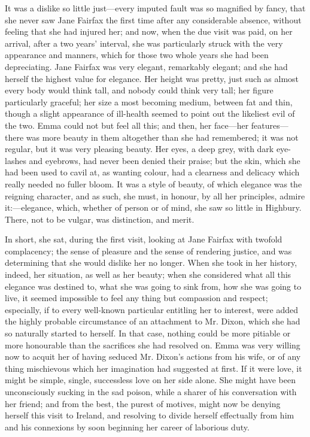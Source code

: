 It was a dislike so little just---every imputed fault was so magnified by fancy, that she never saw Jane Fairfax the first time after any considerable absence, without feeling that she had injured her; and now, when the due visit was paid, on her arrival, after a two years' interval, she was particularly struck with the very appearance and manners, which for those two whole years she had been depreciating. Jane Fairfax was very elegant, remarkably elegant; and she had herself the highest value for elegance. Her height was pretty, just such as almost every body would think tall, and nobody could think very tall; her figure particularly graceful; her size a most becoming medium, between fat and thin, though a slight appearance of ill-health seemed to point out the likeliest evil of the two. Emma could not but feel all this; and then, her face---her features---there was more beauty in them altogether than she had remembered; it was not regular, but it was very pleasing beauty. Her eyes, a deep grey, with dark eye-lashes and eyebrows, had never been denied their praise; but the skin, which she had been used to cavil at, as wanting colour, had a clearness and delicacy which really needed no fuller bloom. It was a style of beauty, of which elegance was the reigning character, and as such, she must, in honour, by all her principles, admire it:---elegance, which, whether of person or of mind, she saw so little in Highbury. There, not to be vulgar, was distinction, and merit.

In short, she sat, during the first visit, looking at Jane Fairfax with twofold complacency; the sense of pleasure and the sense of rendering justice, and was determining that she would dislike her no longer. When she took in her history, indeed, her situation, as well as her beauty; when she considered what all this elegance was destined to, what she was going to sink from, how she was going to live, it seemed impossible to feel any thing but compassion and respect; especially, if to every well-known particular entitling her to interest, were added the highly probable circumstance of an attachment to Mr. Dixon, which she had so naturally started to herself. In that case, nothing could be more pitiable or more honourable than the sacrifices she had resolved on. Emma was very willing now to acquit her of having seduced Mr. Dixon's actions from his wife, or of any thing mischievous which her imagination had suggested at first. If it were love, it might be simple, single, successless love on her side alone. She might have been unconsciously sucking in the sad poison, while a sharer of his conversation with her friend; and from the best, the purest of motives, might now be denying herself this visit to Ireland, and resolving to divide herself effectually from him and his connexions by soon beginning her career of laborious duty.

